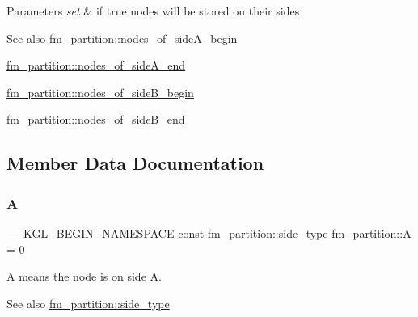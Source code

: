 \begin{DoxyParams}{Parameters}
{\em set} & if {\ttfamily true} nodes will be stored on their sides \\
\hline
\end{DoxyParams}
\begin{DoxySeeAlso}{See also}
\mbox{\hyperlink{classfm__partition_adad3bf33efb4a2b1b0feadeafb33f5fd}{fm\+\_\+partition\+::nodes\+\_\+of\+\_\+side\+A\+\_\+begin}} 

\mbox{\hyperlink{classfm__partition_ac4202d1d929c1700985ad5d452b735fb}{fm\+\_\+partition\+::nodes\+\_\+of\+\_\+side\+A\+\_\+end}} 

\mbox{\hyperlink{classfm__partition_a4e433456ed0214c04466c4f1060b0909}{fm\+\_\+partition\+::nodes\+\_\+of\+\_\+side\+B\+\_\+begin}} 

\mbox{\hyperlink{classfm__partition_a9682b070cce104bdfe69e576df57f560}{fm\+\_\+partition\+::nodes\+\_\+of\+\_\+side\+B\+\_\+end}} 
\end{DoxySeeAlso}


\subsection{Member Data Documentation}
\mbox{\label{classfm__partition_a973d30e9eb0d21f659ef288176cd4791}} 
\subsubsection{\texorpdfstring{A}{A}}
{\footnotesize\ttfamily \+\_\+\+\_\+\+K\+G\+L\+\_\+\+B\+E\+G\+I\+N\+\_\+\+N\+A\+M\+E\+S\+P\+A\+CE const \mbox{\hyperlink{classfm__partition_a7cdff1bea3740a287387e8408e16ca79}{fm\+\_\+partition\+::side\+\_\+type}} fm\+\_\+partition\+::A = 0\hspace{0.3cm}{\ttfamily [static]}}

{\ttfamily A} means the node is on side A.

\begin{DoxySeeAlso}{See also}
\mbox{\hyperlink{classfm__partition_a7cdff1bea3740a287387e8408e16ca79}{fm\+\_\+partition\+::side\+\_\+type}} 
\end{DoxySeeAlso}
\mbox{\label{classfm__partition_a42515c44eecb7ba3e2ec549a877ef238}} 
